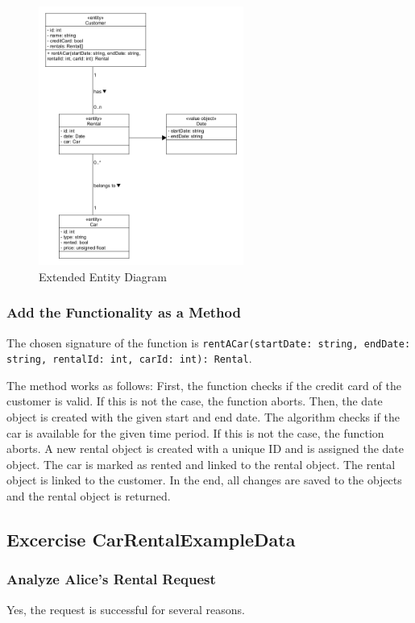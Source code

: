 \begin{figure}[h]
    \centering
    \includegraphics[width=0.6\textwidth]{figures/goLang/carRental/carRental_extendedEntity.png}
    \caption{Extended Entity Diagram}
    \label{fig:extendedEntityDiagram}
\end{figure}

\subsubsection*{Add the Functionality as a Method}
The chosen signature of the function is \texttt{rentACar(startDate: string, endDate: string, rentalId: int, carId: int): Rental}.

The method works as follows:
First, the function checks if the credit card of the customer is valid.
If this is not the case, the function aborts.
Then, the date object is created with the given start and end date.
The algorithm checks if the car is available for the given time period.
If this is not the case, the function aborts.
A new rental object is created with a unique ID and is assigned the date object.
The car is marked as rented and linked to the rental object.
The rental object is linked to the customer.
In the end, all changes are saved to the objects and the rental object is returned.

\subsection{Excercise CarRentalExampleData}
\label{sec:exercise_car_rental_example_data}
\subsubsection*{Analyze Alice's Rental Request}
Yes, the request is successful for several reasons.

